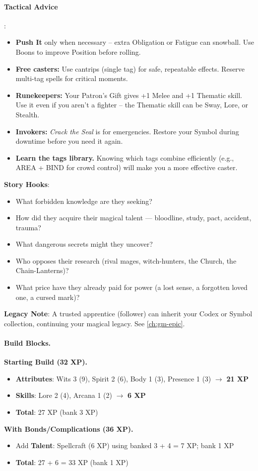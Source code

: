 \paragraph{Tactical Advice}:
\begin{itemize}
\item \textbf{Push It} only when necessary -- extra Obligation or Fatigue can snowball. Use Boons to improve Position before rolling.
\item \textbf{Free casters:} Use cantrips (single tag) for safe, repeatable effects. Reserve multi-tag spells for critical moments.
\item \textbf{Runekeepers:} Your Patron's Gift gives +1 Melee and +1 Thematic skill. Use it even if you aren't a fighter -- the Thematic skill can be Sway, Lore, or Stealth.
\item \textbf{Invokers:} \emph{Crack the Seal} is for emergencies. Restore your Symbol during downtime before you need it again.
\item \textbf{Learn the tags library.} Knowing which tags combine efficiently (e.g., AREA + BIND for crowd control) will make you a more effective caster.
\end{itemize}

\textbf{Story Hooks}:
\begin{itemize}
\item What forbidden knowledge are they seeking?
\item How did they acquire their magical talent --- bloodline, study, pact, accident, trauma?
\item What dangerous secrets might they uncover?
\item Who opposes their research (rival mages, witch-hunters, the Church, the Chain-Lanterns)?
\item What price have they already paid for power (a lost sense, a forgotten loved one, a cursed mark)?
\end{itemize}

\textbf{Legacy Note}: A trusted apprentice (follower) can inherit your Codex or Symbol collection, continuing your magical legacy. See \ref{ch:gm-epic}.

\paragraph{Build Blocks.}
\textbf{Starting Build (32 XP).}
\begin{itemize}
\item \textbf{Attributes}: Wits 3 (9), Spirit 2 (6), Body 1 (3), Presence 1 (3) \(\rightarrow\) \textbf{21 XP}
\item \textbf{Skills}: Lore 2 (4), Arcana 1 (2) \(\rightarrow\) \textbf{6 XP}
\item \textbf{Total}: 27 XP (bank 3 XP)
\end{itemize}
\textbf{With Bonds/Complications (36 XP).}
\begin{itemize}
\item Add \textbf{Talent}: Spellcraft (6 XP) using banked 3 + 4 = 7 XP; bank 1 XP
\item \textbf{Total}: 27 + 6 = 33 XP (bank 1 XP)
\end{itemize}

